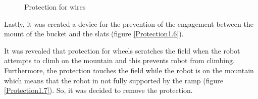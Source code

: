 \begin{figure}[H]
\begin{minipage}[h]{0.47\linewidth}
		\caption{Protection for wires}
		\label{Protection1.5}
	\end{minipage}
\end{figure}

Lastly, it was created a device for the prevention of the engagement between the mount of the bucket and the slats (figure \ref{Protection1.6}).

It was revealed that protection for wheels scratches the field when the robot attempts to climb on the mountain and this prevents robot from climbing. Furthermore, the protection touches the field while the robot is on the mountain which means that the robot in not fully supported by the ramp (figure \ref{Protection1.7}). So, it was decided to remove the protection.

